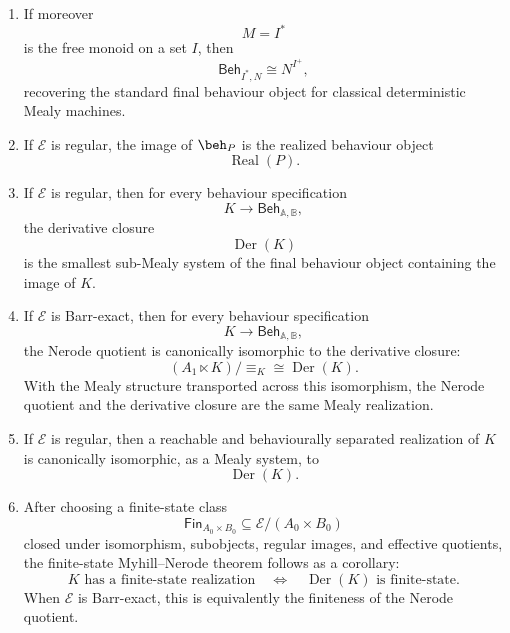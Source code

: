 \begin{theorem}
\begin{enumerate}
\item If moreover
\[
M=I^\ast
\]
is the free monoid on a set \(I\), then
\[
\mathsf{Beh}_{I^\ast,N}
\cong
N^{I^+},
\]
recovering the standard final behaviour object for classical deterministic
Mealy machines.

\item If \(\mathcal E\) is regular, the image of \(\beh_P\) is the realized
behaviour object
\[
\operatorname{Real}(P).
\]

\item If \(\mathcal E\) is regular, then for every behaviour specification
\[
K\to\mathsf{Beh}_{\mathbb A,\mathbb B},
\]
the derivative closure
\[
\operatorname{Der}(K)
\]
is the smallest sub-Mealy system of the final behaviour object containing the
image of \(K\).

\item If \(\mathcal E\) is Barr-exact, then for every behaviour specification
\[
K\to\mathsf{Beh}_{\mathbb A,\mathbb B},
\]
the Nerode quotient is canonically isomorphic to the derivative closure:
\[
(A_1\ltimes K)/{\equiv_K}
\cong
\operatorname{Der}(K).
\]
With the Mealy structure transported across this isomorphism, the Nerode
quotient and the derivative closure are the same Mealy realization.

\item If \(\mathcal E\) is regular, then a reachable and behaviourally
separated realization of \(K\) is canonically isomorphic, as a Mealy system,
to
\[
\operatorname{Der}(K).
\]

\item After choosing a finite-state class
\[
\mathsf{Fin}_{A_0\times B_0}\subseteq\mathcal E/(A_0\times B_0)
\]
closed under isomorphism, subobjects, regular images, and effective quotients,
the finite-state Myhill--Nerode theorem follows as a corollary:
\[
K \text{ has a finite-state realization}
\quad\Longleftrightarrow\quad
\operatorname{Der}(K)
\text{ is finite-state}.
\]
When \(\mathcal E\) is Barr-exact, this is equivalently the finiteness of the
Nerode quotient.
\end{enumerate}
\end{theorem}

